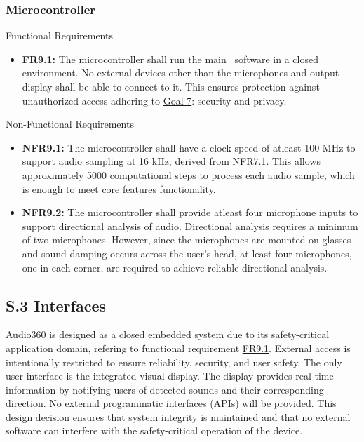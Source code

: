 \documentclass[12pt]{article}
\theoremstyle{definition}
\begin{document}
\subsubsection{\hyperref[comp:microcontroller]{Microcontroller}} Functional
Requirements
\begin{itemize}
  \item \label{FR9_1}\textbf{FR9.1:} The microcontroller shall run the main
  \progname ~software in a closed environment. No external devices other than
  the microphones and output display shall be able to connect to it. This
  ensures protection against unauthorized access adhering to
  \hyperref[goal:user_safety]{Goal 7}: security and privacy.
\end{itemize}

Non-Functional Requirements
\begin{itemize}
  \item \label{NFR9_1}\textbf{NFR9.1:} The microcontroller shall have a clock
  speed of atleast 100 MHz to support audio sampling at 16 kHz, derived from
  \hyperref[NFR7_1]{NFR7.1}. This allows approximately 5000 computational steps
  to process each audio sample, which is enough to meet core features
  functionality.

  \item \label{NFR9_2}\textbf{NFR9.2:} The microcontroller shall provide atleast
  four microphone inputs to support directional analysis of audio.
  Directional analysis requires a minimum of two microphones. However, since the
  microphones are mounted on glasses and sound damping occurs across the user's
  head, at least four microphones, one in each corner, are required to achieve
  reliable directional analysis.
\end{itemize}


\subsection{S.3 Interfaces}
Audio360 is designed as a closed embedded system due to its safety-critical
application domain, refering to functional requirement \hyperref[FR9_1]{FR9.1}.
External access is intentionally restricted to ensure reliability, security, and
user safety. The only user interface is the integrated visual display. The
display provides real-time information by notifying users of detected sounds and
their corresponding direction. No external programmatic interfaces (APIs) will
be provided. This design decision ensures that system integrity is maintained
and that no external software can interfere with the safety-critical operation
of the device.
\end{document}
